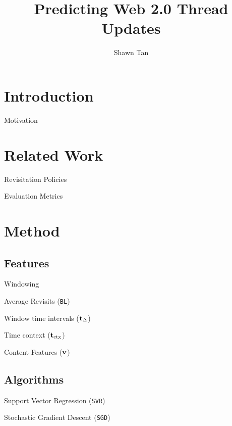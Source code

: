 \documentclass[12pt]{../presentation}
\title{Predicting Web 2.0 Thread Updates}
\author{Shawn Tan}
\date{}
\begin{document}
\maketitle
\section{Introduction}
	\begin{frame}{Motivation}
	\end{frame}
\section{Related Work}
	\begin{frame}{Revisitation Policies}
	\end{frame}
	\begin{frame}{Evaluation Metrics}
	\end{frame}
\section{Method}
\subsection{Features}
	\begin{frame}{Windowing}
	\end{frame}
	\begin{frame}{Average Revisits (\texttt{BL})}
	\end{frame}
	\begin{frame}{Window time intervals ($\mathbf{t}_\Delta$)}
	\end{frame}
	\begin{frame}{Time context ($\mathbf{t}_\text{ctx}$)}
	\end{frame}
	\begin{frame}{Content Features ($\mathbf{v}$)}
	\end{frame}
\subsection{Algorithms}
	\begin{frame}{Support Vector Regression (\texttt{SVR})}\end{frame}
	\begin{frame}{Stochastic Gradient Descent (\texttt{SGD})}\end{frame}
\end{document}
